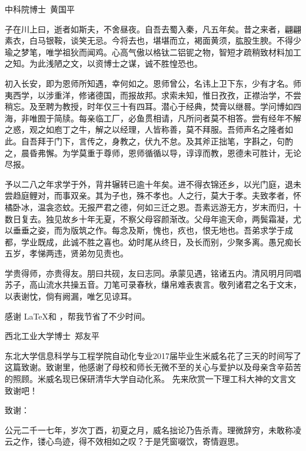 \begin{acknowledgement}
\vfill
\begin{flushright}
  中科院博士\  黄国平
\end{flushright}
\vfill


\newpage

子在川上曰，逝者如斯夫，不舍昼夜。自吾去蜀入秦，凡五年矣。昔之来者，翩翩素衣，白马银鞍，谈笑无忌。今将去也，堪堪而立，褐面黄须，肱股生腴。不得少瑜之梦笔，唯学祖狄而闻鸡。心高气傲以格钛二铝铌之物，智短才疏稍致材料加工之知。为此浅陋之文，以资博士之谋，诚不胜惶恐也。

初入长安，即为恩师所知遇，幸何如之。恩师曾公，名讳上卫下东，少有才名。师夷西学，以涉重洋，修诸德国，而报故邦。求索未知，惟日孜孜，正襟治学，不尝稍忘。及至聘为教授，时年仅三十有四耳。潜心于经典，焚膏以继晷。学问博如四海，非唯囿于简牍。每亲临工厂，必鱼贯相请，凡所问者莫不相答。尝有经年不解之惑，观之如庖丁之牛，解之以经理，人皆称善，莫不拜服。吾师声名之隆者如此。自吾拜于门下，言传之，身教之，伏九不怠。及其斧正拙笔，字斟之，句酌之，晨昏弗懈。为学莫重于尊师，恩师循循以导，谆谆而教，恩德未可胜计，无论尽报。

予以二八之年求学于外，背井辗转已逾十年矣。进不得衣锦还乡，以光门庭，退未尝趋庭鲤对，而事双亲。其为子也，殊不孝也。人之行，莫大于孝。夫致孝者，怀橘卧冰，温衾恣蚊。无报严君之德，何如三迁之恩。吾素远游无方，岁末而归，十数日复去。独见故乡十年无夏，不察父母容颜渐改。父母年逾天命，两鬓霜凝，尤以垂垂之姿，而为版筑之作。每念及斯，愧也，疚也，恨无地也。吾弟求学于成都，学业既成，此诚不胜之喜也。幼时尾从终日，及长而别，少聚多离。愚兄痴长五岁，孝悌两违，贤弟勿见责也。

学贵得师，亦贵得友。朋曰共砚，友曰志同。承蒙见遇，铭诸五内。清风明月同唱苏子，高山流水共操五音。刀笔可录春秋，缣帛难表衷言。敬列诸君之名于文末，以表谢忱，倘有阙漏，唯乞见谅耳。

  感谢 \LaTeX 和 \nwafuthesis，帮我节省了不少时间。

\vfill
\begin{flushright}
  西北工业大学博士\  郑友平
\end{flushright}
\vfill

\newpage


东北大学信息科学与工程学院自动化专业2017届毕业生米威名花了三天的时间写了这篇致谢。致谢里，他感谢了母校和师长无微不至的关心与爱护以及母亲含辛茹苦的照顾。米威名现已保研清华大学自动化系。
先来欣赏一下理工科大神的文言文致谢吧！

致谢：

公元二千一七年，岁次丁酉，初夏之月，威名拙论乃告杀青。理微辞穷，未敢称凌云之作，镂心鸟迹，得不效相如之叹？于是凭窗啜饮，寄情遐思。


\end{acknowledgement}
